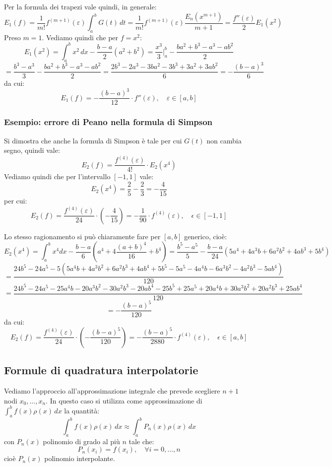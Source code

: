 \documentclass[a4paper,11pt]{article}
\begin{document}
\par\smallskip

Per la formula dei trapezi vale quindi, in generale:
$$
E_1 (f) = \frac{1}{m!} f^{(m + 1)}(\varepsilon) \int_a^b G(t) \, dt = \frac{1}{m!} f^{(m + 1)}(\varepsilon) \frac{E_n(x^{m + 1})}{m + 1} = \frac{f''(\varepsilon)}{2} E_1(x^2)
$$
Preso $m = 1$.
Vediamo quindi che per $f = x^2$:
$$
E_1(x^2) = \int_a^b x^2 \, dx - \frac{b - a}{2} (a^2 + b^2) = \frac{x^3}{3} \Big|^b_a - \frac{ba^2 + b^3 - a^3 - ab^2}{2}
$$
$$
= \frac{b^3 - a^3}{3} -  \frac{ba^2 + b^3 - a^3 - ab^2}{2} = \frac{2b^3 - 2a^3 - 3ba^2 - 3b^3 + 3a^2 + 3ab^2}{6} = - \frac{(b - a)^3}{6}
$$ 
da cui:
$$
E_1(f) = - \frac{(b - a)^3}{12} \cdot f''(\varepsilon), \quad \varepsilon \in [a, b]
$$

\subsubsection{Esempio: errore di Peano nella formula di Simpson}
Si dimostra che anche la formula di Simpson è tale per cui $G(t)$ non cambia segno, quindi vale:
$$
E_2(f) = \frac{f^{(4)} (\varepsilon)}{4!} \cdot E_2(x^4) 
$$
Vediamo quindi che per l'intervallo $[-1, 1]$ vale:
$$
E_2(x^4) = \frac{2}{5} - \frac{2}{3} = - \frac{4}{15}
$$
per cui:
$$
E_2(f) = \frac{f^{(4)}(\varepsilon)}{24} \cdot \left( - \frac{4}{15} \right) = -\frac{1}{90} \cdot f^{(4)} (\varepsilon), \quad \epsilon \in [-1, 1] 
$$

Lo stesso ragionamento si può chiaramente fare per $[a, b]$ generico, cioè:
$$
E_2(x^4) = \int_{a}^{b}x^{4}dx-\frac{b-a}{6}\left(a^{4}+4\frac{\left(a+b\right)^{4}}{16}+b^{4}\right) = \frac{b^{5}-a^{5}}{5}-\frac{b-a}{24}\left(5a^{4}+4a^{3}b+6a^{2}b^{2}+4ab^{3}+5b^{4}\right)
$$
$$
= \frac{24b^{5}-24a^{5}-5\left(5a^{4}b+4a^{3}b^{2}+6a^{2}b^{3}+4ab^{4}+5b^{5}-5a^{5}-4a^{4}b-6a^{3}b^{2}-4a^{2}b^{3}-5ab^{4}\right)}{120}
$$
$$
= \frac{24b^{5}-24a^{5}-25a^{4}b-20a^{3}b^{2}-30a^{2}b^{3}-20ab^{4}-25b^{5}+25a^{5}+20a^{4}b+30a^{3}b^{2}+20a^{2}b^{3}+25ab^{4}}{120}
$$
$$
= -\frac{\left(b-a\right)^{5}}{120}
$$
da cui:
$$
E_2(f) = \frac{f^{(4)}(\varepsilon)}{24} \cdot \left( -\frac{\left(b-a\right)^{5}}{120} \right) = -\frac{(b - a)^5}{2880} \cdot f^{(4)} (\varepsilon), \quad \epsilon \in [a, b] 
$$


\subsection{Formule di quadratura interpolatorie}
Vediamo l'approccio all'approssimazione integrale che prevede scegliere $n + 1$ nodi $x_0, ..., x_n$.
In questo caso si utilizza come approssimazione di $\int_a^b f(x) \rho(x) \, dx$ la quantità:
$$
\int_a^b f(x) \rho(x) \, dx \approx \int_a^b P_n(x) \rho(x) \, dx
$$
con $P_n(x)$ polinomio di grado al più $n$ tale che:
$$
P_n(x_i) = f(x_i), \quad \forall i = 0, ..., n
$$
cioè $P_n(x)$ polinomio interpolante.
\end{document}
